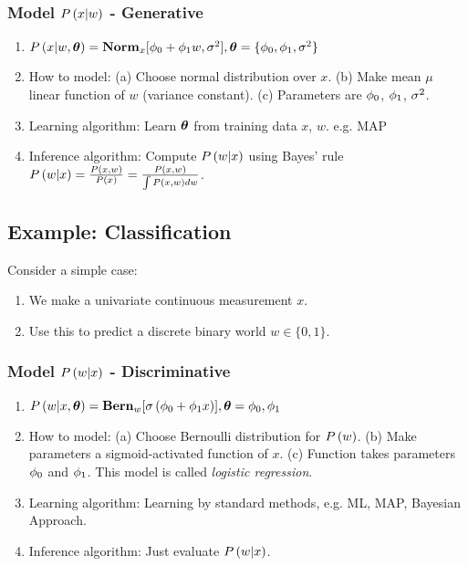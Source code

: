\subsubsection*{Model $\P{x|w}$ - Generative}
	\begin{enumerate}
		\item $\P{x|w,\vec{\th}}=\Norm_x[\ph_0+\ph_1w,\si^2], \vec{\th}=\{\ph_0,\ph_1,\si^2\}$
		\item How to model: (a) Choose normal distribution over $x$. (b) Make mean $\mu$ linear function of $w$ (variance constant). (c) Parameters are $\ph_0$, $\ph_1$, $\si^2$.
		\item Learning algorithm: Learn $\vec{\th}$ from training data $x$, $w$. e.g. MAP
		\item Inference algorithm: Compute $\P{w|x}$ using Bayes' rule $\P{w|x}=\frac{\P{x,w}}{\P{x}}=\frac{\P{x,w}}{\int\P{x,w}dw}$.
	\end{enumerate}

\subsection{Example: Classification}

Consider a simple case:
	\begin{enumerate}
		\item We make a univariate continuous measurement $x$.
		\item Use this to predict a discrete binary world $w \in \{0,1\}$.
	\end{enumerate}

\subsubsection*{Model $\P{w|x}$ - Discriminative}
	\begin{enumerate}
		\item $\P{w|x,\vec{\th}}=\Bern_w[\sig{\ph_0+\ph_1x}], \vec{\th}={\ph_0,\ph_1}$
		\item How to model: (a) Choose Bernoulli distribution for $\P{w}$. (b) Make parameters a sigmoid-activated function of $x$. (c) Function takes parameters $\ph_0$ and $\ph_1$. This model is called \textit{logistic regression}.
		\item Learning algorithm: Learning by standard methods, e.g. ML, MAP, Bayesian Approach.
		\item Inference algorithm: Just evaluate $\P{w|x}$.
	\end{enumerate}


